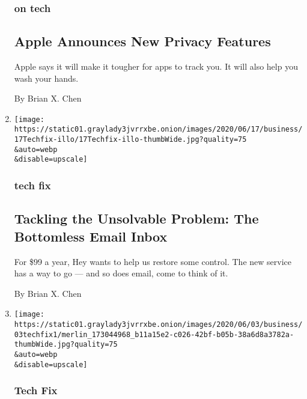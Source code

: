 \begin{enumerate}
  \hypertarget{on-tech}{%
  \subsubsection{on tech}\label{on-tech}}

  \hypertarget{apple-announces-new-privacy-features}{%
  \subsection{Apple Announces New Privacy
  Features}\label{apple-announces-new-privacy-features}}

  Apple says it will make it tougher for apps to track you. It will also
  help you wash your hands.

  By Brian X. Chen
\item
  \href{/2020/06/17/technology/personaltech/hey-email-service-screening.html}{}

  \texttt{[image: https://static01.graylady3jvrrxbe.onion/images/2020/06/17/business/17Techfix-illo/17Techfix-illo-thumbWide.jpg?quality=75\\\&auto=webp\\\&disable=upscale]}

  \hypertarget{tech-fix-5}{%
  \subsubsection{tech fix}\label{tech-fix-5}}

  \hypertarget{tackling-the-unsolvable-problem-the-bottomless-email-inbox}{%
  \subsection{Tackling the Unsolvable Problem: The Bottomless Email
  Inbox}\label{tackling-the-unsolvable-problem-the-bottomless-email-inbox}}

  For \$99 a year, Hey wants to help us restore some control. The new
  service has a way to go --- and so does email, come to think of it.

  By Brian X. Chen
\item
  \href{/2020/06/03/technology/personaltech/e-bikes-are-having-their-moment-they-deserve-it.html}{}

  \texttt{[image: https://static01.graylady3jvrrxbe.onion/images/2020/06/03/business/03techfix1/merlin\_173044968\_b11a15e2-c026-42bf-b05b-38a6d8a3782a-thumbWide.jpg?quality=75\\\&auto=webp\\\&disable=upscale]}

  \hypertarget{tech-fix-6}{%
  \subsubsection{Tech Fix}\label{tech-fix-6}}


\end{enumerate}
